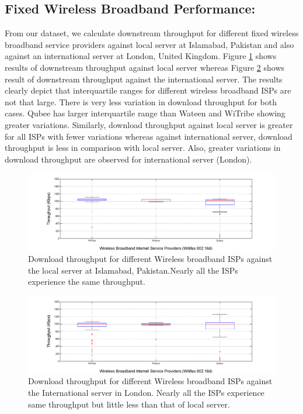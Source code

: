 \documentclass{sig-alternate-10pt}
\begin{document}
\begin{sloppypar}
\subsection {Fixed Wireless Broadband Performance:}
\indent From our dataset, we calculate downstream throughput for different fixed wireless broadband service providers against local server at Islamabad, Pakistan and also against an international server at London, United Kingdom. Figure \ref{Fig:5} shows results of downstream throughput against local server whereas Figure \ref{Fig:6} shows result of downstream throughput against the international server. The results clearly depict that interquartile ranges for different wireless broadband ISPs are not that large. There is very less variation in download throughput for both cases. Qubee has larger interquartile range than Wateen and WiTribe showing greater variations. Similarly, download throughput against local server is greater for all ISPs with fewer variations whereas against international server, download throughput is less in comparison with local server. Also, greater variations in download throughput are observed for international server (London).

\begin{figure}[t!]
\begin {center}
   \includegraphics[height=0.2 \textheight,width=0.5 \textwidth]{5.png}
   \end {center}
 \caption{Download throughput for different Wireless broadband ISPs against the local server at Islamabad, Pakistan.Nearly all the ISPs experience the same throughput.} \label{Fig:5}
\end{figure}
\begin{figure}[t!]
\begin {center}
   \includegraphics[height=0.2 \textheight,width=0.5 \textwidth]{6.png}
   \end {center}
 \caption{Download throughput for different Wireless broadband ISPs against the International server in London. Nearly all the ISPs experience same throughput but little less than that of local server.} \label{Fig:6}
\end{figure}


\end{sloppypar}
\end{document}
